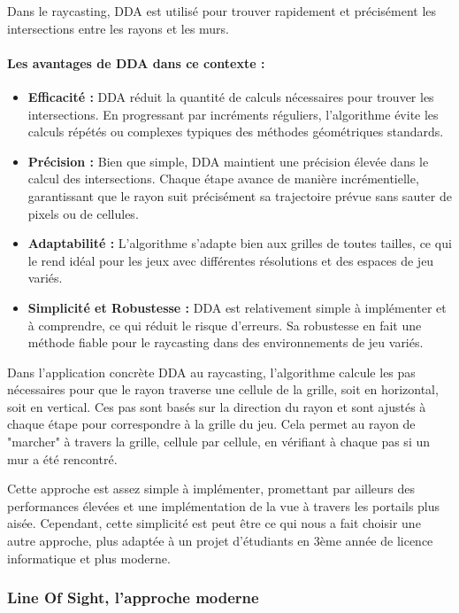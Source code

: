 \documentclass[11pt]{article}
\begin{document}
Dans le raycasting, DDA est utilisé pour trouver rapidement et précisément les intersections entre les rayons et les murs. 

\paragraph{Les avantages de DDA dans ce contexte :}
\begin{itemize}
\item \textbf{Efficacité :} DDA réduit la quantité de calculs nécessaires pour trouver les intersections. En progressant par 
incréments réguliers, l'algorithme évite les calculs répétés ou complexes typiques des méthodes géométriques standards.
\item \textbf{Précision :} Bien que simple, DDA maintient une précision élevée dans le calcul des intersections. Chaque étape 
avance de manière incrémentielle, garantissant que le rayon suit précisément sa trajectoire prévue sans sauter de pixels ou de cellules.
\item \textbf{Adaptabilité :} L'algorithme s'adapte bien aux grilles de toutes tailles, ce qui le rend idéal pour les jeux avec 
différentes résolutions et des espaces de jeu variés.
\item \textbf{Simplicité et Robustesse :} DDA est relativement simple à implémenter et à comprendre, ce qui réduit le risque 
d'erreurs. Sa robustesse en fait une méthode fiable pour le raycasting dans des environnements de jeu variés.
\end{itemize}

Dans l'application concrète DDA au raycasting, l'algorithme calcule les pas nécessaires pour que le rayon 
traverse une cellule de la grille, soit en horizontal, soit en vertical. Ces pas sont basés sur la direction du 
rayon et sont ajustés à chaque étape pour correspondre à la grille du jeu. Cela permet au rayon de "marcher" à travers 
la grille, cellule par cellule, en vérifiant à chaque pas si un mur a été rencontré.

\noindent Cette approche est assez simple à implémenter, promettant par ailleurs des performances élevées et 
une implémentation de la vue à travers les portails plus aisée. Cependant, cette simplicité est peut être ce qui 
nous a fait choisir une autre approche, plus adaptée à un projet d'étudiants en 3ème année de licence informatique et plus moderne.
 
\subsubsection{Line Of Sight, l'approche moderne}
\end{document}
